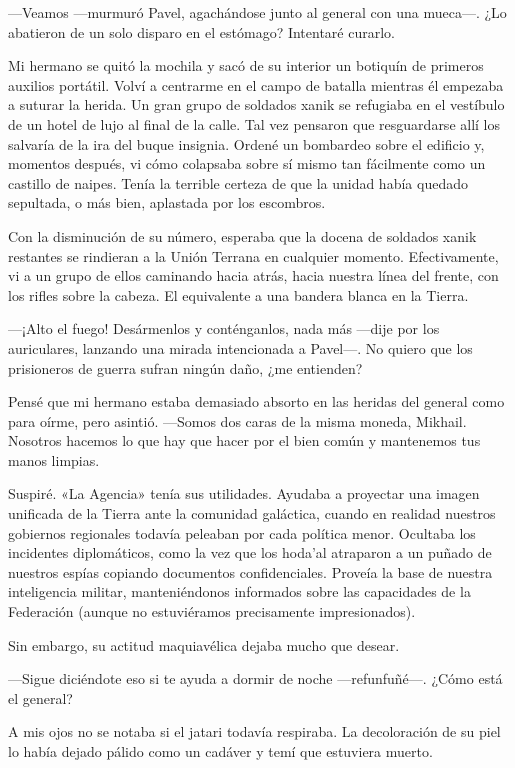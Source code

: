 —Veamos —murmuró Pavel, agachándose junto al general con una mueca—. ¿Lo abatieron de un solo disparo en el estómago? Intentaré curarlo.

Mi hermano se quitó la mochila y sacó de su interior un botiquín de primeros auxilios portátil. Volví a centrarme en el campo de batalla mientras él empezaba a suturar la herida. Un gran grupo de soldados xanik se refugiaba en el vestíbulo de un hotel de lujo al final de la calle. Tal vez pensaron que resguardarse allí los salvaría de la ira del buque insignia. Ordené un bombardeo sobre el edificio y, momentos después, vi cómo colapsaba sobre sí mismo tan fácilmente como un castillo de naipes. Tenía la terrible certeza de que la unidad había quedado sepultada, o más bien, aplastada por los escombros.

Con la disminución de su número, esperaba que la docena de soldados xanik restantes se rindieran a la Unión Terrana en cualquier momento. Efectivamente, vi a un grupo de ellos caminando hacia atrás, hacia nuestra línea del frente, con los rifles sobre la cabeza. El equivalente a una bandera blanca en la Tierra.

—¡Alto el fuego! Desármenlos y conténganlos, nada más —dije por los auriculares, lanzando una mirada intencionada a Pavel—. No quiero que los prisioneros de guerra sufran ningún daño, ¿me entienden?

Pensé que mi hermano estaba demasiado absorto en las heridas del general como para oírme, pero asintió. —Somos dos caras de la misma moneda, Mikhail. Nosotros hacemos lo que hay que hacer por el bien común y mantenemos tus manos limpias.

Suspiré. «La Agencia» tenía sus utilidades. Ayudaba a proyectar una imagen unificada de la Tierra ante la comunidad galáctica, cuando en realidad nuestros gobiernos regionales todavía peleaban por cada política menor. Ocultaba los incidentes diplomáticos, como la vez que los hoda'al atraparon a un puñado de nuestros espías copiando documentos confidenciales. Proveía la base de nuestra inteligencia militar, manteniéndonos informados sobre las capacidades de la Federación (aunque no estuviéramos precisamente impresionados).

Sin embargo, su actitud maquiavélica dejaba mucho que desear.

—Sigue diciéndote eso si te ayuda a dormir de noche —refunfuñé—. ¿Cómo está el general?

A mis ojos no se notaba si el jatari todavía respiraba. La decoloración de su piel lo había dejado pálido como un cadáver y temí que estuviera muerto.

